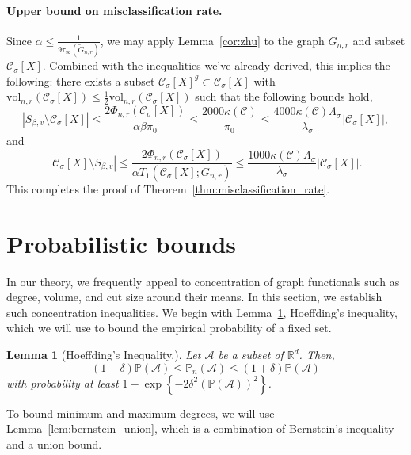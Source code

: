 \documentclass[11pt,twoside]{article}
\newtheorem{lemma}{Lemma}
\theoremstyle{definition}
\newcommand{\set}[1]{\left\{#1\right\}}
\newcommand{\vol}{\mathrm{vol}}
\newcommand{\abs}[1]{\left \lvert #1 \right \rvert}
\newcommand{\Reals}{\mathbb{R}}
\newcommand{\1}{\mathbbm{1}}
\newcommand{\Xbf}{X}
\newcommand{\Pbb}{\mathbb{P}}
\newcommand{\Cset}{\mathcal{C}}
\newcommand{\Csig}{\Cset_{\sigma}}
\begin{document}
\paragraph{Upper bound on misclassification rate.}
Since $\alpha \leq \frac{1}{9\tau_{\infty}(\widetilde{G}_{n,r})}$, we may apply Lemma~\ref{cor:zhu} to the graph $G_{n,r}$ and subset $\Csig[\Xbf]$. Combined with the inequalities we've already derived, this implies the following: there exists a subset $\Csig[\Xbf]^g \subset \Csig[\Xbf]$ with $\vol_{n,r}(\Csig[\Xbf]) \leq \frac{1}{2}\vol_{n,r}(\Csig[\Xbf])$ such that the following bounds hold,
\begin{equation*}
\abs{S_{\beta,v} \setminus \Csig[\Xbf]} \leq \frac{2\Phi_{n,r}(\Csig[\Xbf])}{\alpha \beta \pi_0} \leq \frac{2000 \kappa(\Cset)}{\pi_0} \leq \frac{4000 \kappa(\Cset) \Lambda_{\sigma}}{\lambda_{\sigma}}\abs{\Csig[\Xbf]},
\end{equation*}
and
\begin{equation*}
\abs{\Csig[\Xbf] \setminus S_{\beta,v}} \leq \frac{2\Phi_{n,r}(\Csig[\Xbf])}{\alpha T_1(\Csig[\Xbf];G_{n,r})} \leq \frac{1000 \kappa(\Cset) \Lambda_{\sigma}}{\lambda_{\sigma}}\abs{\Csig[\Xbf]}.
\end{equation*}
This completes the proof of Theorem~\ref{thm:misclassification_rate}.

\section{Probabilistic bounds}
\label{sec: concentration}

In our theory, we frequently appeal to concentration of graph functionals such as degree, volume, and cut size around their means. In this section, we establish such concentration inequalities. We begin with Lemma~\ref{lem:hoeffding_2}, Hoeffding's inequality, which we will use to bound the empirical probability of a fixed set.
\begin{lemma}[Hoeffding's Inequality.]
	\label{lem:hoeffding_2}
	Let $\mathcal{A}$ be a subset of $\Reals^d$. Then,
	\begin{equation*}
	(1 - \delta) \Pbb(\mathcal{A}) \leq \Pbb_n(\mathcal{A}) \leq (1 + \delta)\Pbb(\mathcal{A})
	\end{equation*}
	with probability at least $1 - \exp\set{-2\delta^2(\Pbb(\mathcal{A}))^2}$. 
\end{lemma}

To bound minimum and maximum degrees, we will use Lemma~\ref{lem:bernstein_union}, which is a combination of Bernstein's inequality and a union bound.
\end{document}
